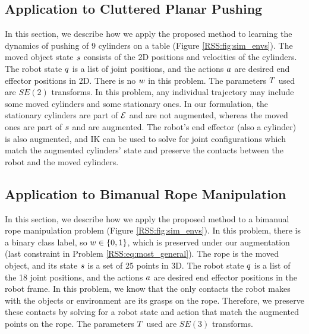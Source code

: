 \subsection{Application to Cluttered Planar Pushing}

In this section, we describe how we apply the proposed method to learning the dynamics of pushing of 9 cylinders on a table (Figure \ref{RSS:fig:sim_envs}). The moved object state $s$ consists of the 2D positions and velocities of the cylinders. The robot state $q$ is a list of joint positions, and the actions $a$ are desired end effector positions in 2D. There is no $w$ in this problem. The parameters $T$ used are $SE(2)$ transforms. In this problem, any individual trajectory may include some moved cylinders and some stationary ones. In our formulation, the stationary cylinders are part of $\mathcal{E}$ and are not augmented, whereas the moved ones are part of $s$ and are augmented. The robot's end effector (also a cylinder) is also augmented, and IK can be used to solve for joint configurations which match the augmented cylinders' state and preserve the contacts between the robot and the moved cylinders.

\subsection{Application to Bimanual Rope Manipulation}

In this section, we describe how we apply the proposed method to a bimanual rope manipulation problem (Figure \ref{RSS:fig:sim_envs}). In this problem, there is a binary class label, so $w\in\{0,1\}$, which is preserved under our augmentation (last constraint in Problem \eqref{RSS:eq:most_general}). The rope is the moved object, and its state $s$ is a set of 25 points in 3D. The robot state $q$ is a list of the 18 joint positions, and the actions $a$ are desired end effector positions in the robot frame. In this problem, we know that the only contacts the robot makes with the objects or environment are its grasps on the rope. Therefore, we preserve these contacts by solving for a robot state and action that match the augmented points on the rope. The parameters $T$ used are $SE(3)$ transforms.

